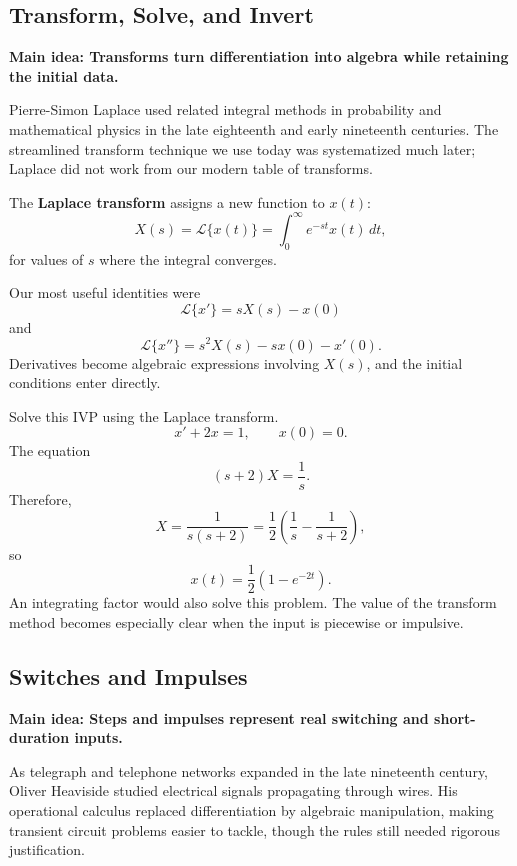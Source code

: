 \documentclass[11pt,letterpaper]{article}
\begin{document}
\subsection{Transform, Solve, and Invert}
\textbf{Main idea: Transforms turn differentiation into algebra while retaining the initial data.}

Pierre-Simon Laplace used related integral methods
in probability and mathematical physics in the late
eighteenth and early nineteenth centuries.
The streamlined transform technique we use today
was systematized much later; Laplace did not
work from our modern table of transforms.


The \textbf{Laplace transform} assigns a new function
to $x(t)$:
\[
X(s)=\mathcal{L}\{x(t)\}
=\int_0^\infty e^{-st}x(t)\,dt,
\]
for values of $s$ where the integral converges.

Our most useful identities were
\[
\mathcal{L}\{x'\}=sX(s)-x(0)
\]
and
\[
\mathcal{L}\{x''\}
=s^2X(s)-sx(0)-x'(0).
\]
Derivatives become algebraic expressions involving
$X(s)$, and the initial conditions enter directly.

\begin{example}{
Solve this IVP using the Laplace transform.
\[
x'+2x=1,\qquad x(0)=0.
\]
}
The equation
\[
(s+2)X=\frac1s.
\]
Therefore,
\[
X=\frac{1}{s(s+2)}
=\frac12\left(\frac1s-\frac1{s+2}\right),
\]
so
\[
\boxed{x(t)=\frac12(1-e^{-2t}).}
\]
An integrating factor would also solve this problem.
The value of the transform method becomes especially
clear when the input is piecewise or impulsive.
\end{example}

\subsection{Switches and Impulses}

\textbf{Main idea: Steps and impulses represent real switching and short-duration inputs.}

As telegraph and telephone networks expanded in the
late nineteenth century, Oliver Heaviside studied
electrical signals propagating through wires.
His operational calculus replaced differentiation
by algebraic manipulation, making transient circuit
problems easier to tackle, though the rules still
needed rigorous justification.
\end{document}
